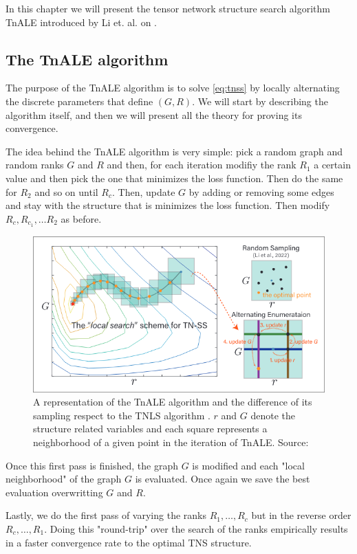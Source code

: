 \documentclass[11pt,a4paper,openright,oneside]{book}
\numberwithin{equation}{section}
\begin{document}
{In this chapter we will present the tensor network structure search algorithm \gls{TnALE}
introduced by Li et. al. on \cite{liAlternatingLocalEnumeration2023a}.

\subsection{The TnALE algorithm}

The purpose of the \gls{TnALE} algorithm is to solve \ref{eq:tnss} by locally alternating the discrete parameters that define $(G, R)$.
We will start by describing the algorithm itself, and then we will present all the theory for proving its convergence.

The idea behind the TnALE algorithm is very simple: pick a random graph and random ranks $G$ and $R$ and then, for each iteration modifiy
the rank $R_1$ a certain value and then pick the one that minimizes the loss function. Then do the same
for $R_2$ and so on until $R_c$. Then, update $G$ by adding or removing some edges and stay with the structure that is minimizes the loss function.
Then modify $R_c, R_{c_1}, \dots R_2$ as before.

\begin{figure}[H]
    \centering
    \includegraphics[width=0.75\linewidth]{media/tnale-schema.png}
    \caption{A representation of the TnALE algorithm and the difference of its sampling respect to the \gls{TNLS} algorithm \cite{liPermutationSearchTensor2022}. $r$ and $G$
    denote the structure related variables and each square represents a neighborhood of a given point in the iteration of \gls{TnALE}. Source: \cite{liAlternatingLocalEnumeration2023}}
\end{figure}

Once this first pass is finished, the graph $G$ is modified and each "local neighborhood" of the graph $G$ is evaluated.
Once again we save the best evaluation overwritting $G$ and $R$.

Lastly, we do the first pass of varying the ranks $R_1, \dots, R_c$ but in the reverse order $R_c, \dots, R_1$.
Doing this "round-trip" over the search of the ranks empirically results in a faster convergence rate to the
optimal \gls{TNS} structure.

}
\end{document}
